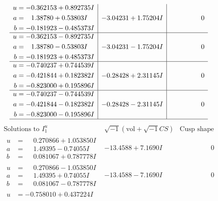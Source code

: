 \documentclass[1p]{elsarticle_modified}
\theoremstyle{definition}
\newcommand{\I}{\sqrt{-1}}
\begin{document}
$$\begin{array}{c|c|c}
\begin{aligned}
u &= -0.362153 + 0.892735 I \\
a &= \phantom{-}1.38780 + 0.53803 I \\
b &= -0.181923 - 0.485373 I\end{aligned}
 & -3.04231 + 1.75204 I & \phantom{-0.000000 } 0 \\ \hline\begin{aligned}
u &= -0.362153 - 0.892735 I \\
a &= \phantom{-}1.38780 - 0.53803 I \\
b &= -0.181923 + 0.485373 I\end{aligned}
 & -3.04231 - 1.75204 I & \phantom{-0.000000 } 0 \\ \hline\begin{aligned}
u &= -0.740237 + 0.744539 I \\
a &= -0.421844 + 0.182382 I \\
b &= -0.823000 + 0.195896 I\end{aligned}
 & -0.28428 + 2.31145 I & \phantom{-0.000000 } 0 \\ \hline\begin{aligned}
u &= -0.740237 - 0.744539 I \\
a &= -0.421844 - 0.182382 I \\
b &= -0.823000 - 0.195896 I\end{aligned}
 & -0.28428 - 2.31145 I & \phantom{-0.000000 } 0\\
 \hline 
 \end{array}$$\newpage$$\begin{array}{c|c|c}  
\text{Solutions to }I^u_{1}& \I (\text{vol} + \sqrt{-1}CS) & \text{Cusp shape}\\
 \hline 
\begin{aligned}
u &= \phantom{-}0.270866 + 1.053850 I \\
a &= \phantom{-}1.49395 - 0.74055 I \\
b &= \phantom{-}0.081067 + 0.787778 I\end{aligned}
 & -13.4588 + 7.1690 I & \phantom{-0.000000 } 0 \\ \hline\begin{aligned}
u &= \phantom{-}0.270866 - 1.053850 I \\
a &= \phantom{-}1.49395 + 0.74055 I \\
b &= \phantom{-}0.081067 - 0.787778 I\end{aligned}
 & -13.4588 - 7.1690 I & \phantom{-0.000000 } 0 \\ \hline\begin{aligned}
u &= -0.758010 + 0.437224 I \\

\end{aligned}
\end{array}$$
\end{document}
